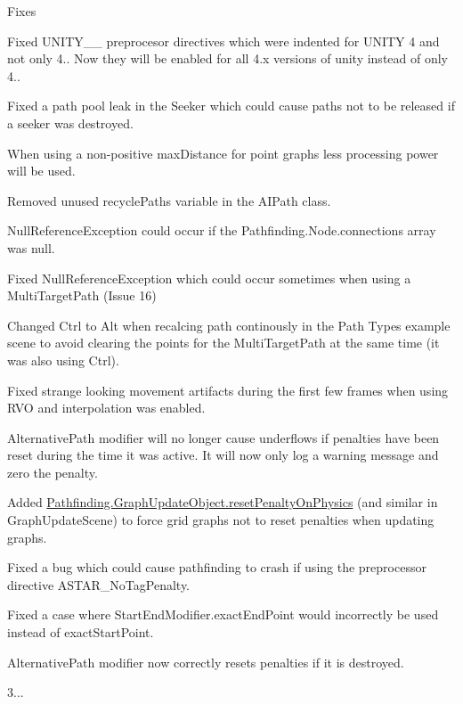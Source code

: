 \begin{DoxyItemize}
\begin{DoxyItemize}
\item Fixes
\begin{DoxyItemize}
\item Fixed U\+N\+I\+T\+Y\+\_\+\_ preprocesor directives which were indented for U\+N\+I\+TY 4 and not only 4.. Now they will be enabled for all 4.\+x versions of unity instead of only 4..
\item Fixed a path pool leak in the Seeker which could cause paths not to be released if a seeker was destroyed.
\item When using a non-\/positive max\+Distance for point graphs less processing power will be used.
\item Removed unused \textquotesingle{}recycle\+Paths\textquotesingle{} variable in the A\+I\+Path class.
\item Null\+Reference\+Exception could occur if the Pathfinding.\+Node.\+connections array was null.
\item Fixed Null\+Reference\+Exception which could occur sometimes when using a Multi\+Target\+Path (Issue 16)
\item Changed Ctrl to Alt when recalcing path continously in the Path Types example scene to avoid clearing the points for the Multi\+Target\+Path at the same time (it was also using Ctrl).
\item Fixed strange looking movement artifacts during the first few frames when using R\+VO and interpolation was enabled.
\item Alternative\+Path modifier will no longer cause underflows if penalties have been reset during the time it was active. It will now only log a warning message and zero the penalty.
\item Added \mbox{\hyperlink{class_pathfinding_1_1_graph_update_object_a7462e9e4ec8d6831c65213306cd41baa}{Pathfinding.\+Graph\+Update\+Object.\+reset\+Penalty\+On\+Physics}} (and similar in Graph\+Update\+Scene) to force grid graphs not to reset penalties when updating graphs.
\item Fixed a bug which could cause pathfinding to crash if using the preprocessor directive A\+S\+T\+A\+R\+\_\+\+No\+Tag\+Penalty.
\item Fixed a case where Start\+End\+Modifier.\+exact\+End\+Point would incorrectly be used instead of exact\+Start\+Point.
\item Alternative\+Path modifier now correctly resets penalties if it is destroyed.
\end{DoxyItemize}
\end{DoxyItemize}
\item 3...

\end{DoxyItemize}
